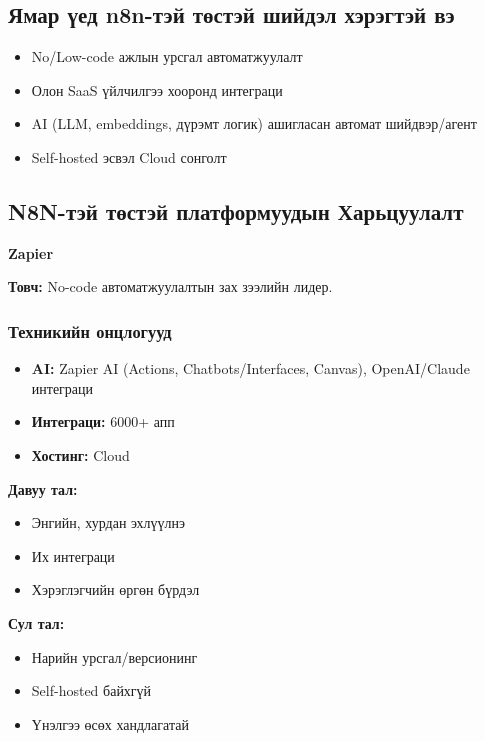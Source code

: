 \subsection{Ямар үед n8n-тэй төстэй шийдэл хэрэгтэй вэ}

\begin{itemize}
    \item No/Low-code ажлын урсгал автоматжуулалт
    \item Олон SaaS үйлчилгээ хооронд интеграци
    \item AI (LLM, embeddings, дүрэмт логик) ашигласан автомат шийдвэр/агент
    \item Self-hosted эсвэл Cloud сонголт
\end{itemize}

\subsection{N8N-тэй төстэй платформуудын Харьцуулалт}

\textbf{Zapier}

\textbf{Товч:} No-code автоматжуулалтын зах зээлийн лидер.

\subsubsection{Техникийн онцлогууд}
\begin{itemize}
    \item \textbf{AI:} Zapier AI (Actions, Chatbots/Interfaces, Canvas), OpenAI/Claude интеграци
    \item \textbf{Интеграци:} 6000+ апп
    \item \textbf{Хостинг:} Cloud
\end{itemize}


{\textbf{Давуу тал:}}
\begin{itemize}
    \item Энгийн, хурдан эхлүүлнэ
    \item Их интеграци
    \item Хэрэглэгчийн өргөн бүрдэл
\end{itemize}

{\textbf{Сул тал:}}
\begin{itemize}
    \item Нарийн урсгал/версионинг
    \item Self-hosted байхгүй
    \item Үнэлгээ өсөх хандлагатай
\end{itemize}

